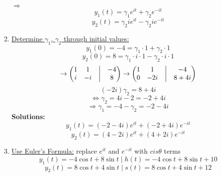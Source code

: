 \documentclass{article}
\begin{document}
\begin{enumerate}
    $\Rightarrow$
    \begin{equation*} y_1(t) = \gamma_1 e^{i t} + \gamma_2 e^{-i t} \end{equation*}
    \begin{equation*} y_2(t) = \gamma_2 i e^{i t} - \gamma_2 i e^{-i t} \end{equation*} 
    \item \underline{Determine $\gamma_1$, $\gamma_2$ through initial values:}
    \begin{equation*} y_1(0) = -4 = \gamma_1 \cdot 1 + \gamma_2 \cdot 1 \end{equation*}
    \begin{equation*} y_2(0) = 8 = \gamma_1 \cdot i \cdot 1 - \gamma_2 \cdot i \cdot 1 \end{equation*}
    \begin{equation*} \rightarrow \begin{pmatrix} 1 & 1 &\bigm| & -4 \\  i & -i &\bigm| & 8  \end{pmatrix} \rightarrow \begin{pmatrix} 1 & 1 &\bigm| & -4 \\ 0 & -2i &\bigm| & 8+4i \end{pmatrix} \end{equation*}
    \begin{equation*} (-2i) \gamma_2  = 8 + 4 i \end{equation*}
    \begin{equation*} \Leftrightarrow \gamma_2 = 4i - 2 = -2 + 4i \end{equation*} 
    \begin{equation*} \Rightarrow \gamma_1 = -4 - \gamma_2 = -2 - 4i \end{equation*}
    \textbf{Solutions:}
    \begin{equation*} y_1(t) = (-2 - 4i) e^{i t} + (-2 + 4i) e^{-i t} \end{equation*} 
    \begin{equation*} y_2(t) = (4 - 2i) e^{i t} + (4 + 2i) e^{-i t} \end{equation*}
    \item \underline{Use Euler's Formula:} replace $e^{i t}$ and $e^{-i t}$ with $cis\theta$ terms
    \begin{equation*} y_1(t) = -4\cos t + 8\sin t \mid h(t) = -4\cos t + 8\sin t + 10\end{equation*}
    \begin{equation*} y_2(t) = 8\cos t + 4\sin t \mid s(t) = 8\cos t + 4\sin t + 12 \end{equation*}
\end{enumerate} \vspace{10mm}
\end{document}
